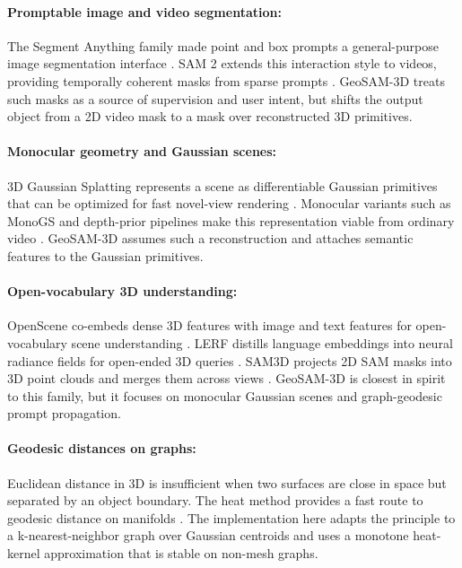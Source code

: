 \documentclass{article}
\begin{document}
\paragraph{Promptable image and video segmentation:}
The Segment Anything family made point and box prompts a general-purpose image segmentation interface \citep{kirillov2023segment}. SAM 2 extends this interaction style to videos, providing temporally coherent masks from sparse prompts \citep{ravi2024sam2}. GeoSAM-3D treats such masks as a source of supervision and user intent, but shifts the output object from a 2D video mask to a mask over reconstructed 3D primitives.

\paragraph{Monocular geometry and Gaussian scenes:}
3D Gaussian Splatting represents a scene as differentiable Gaussian primitives that can be optimized for fast novel-view rendering \citep{kerbl20233d}. Monocular variants such as MonoGS and depth-prior pipelines make this representation viable from ordinary video \citep{matsuki2024monogs,yang2024depth}. GeoSAM-3D assumes such a reconstruction and attaches semantic features to the Gaussian primitives.

\paragraph{Open-vocabulary 3D understanding:}
OpenScene co-embeds dense 3D features with image and text features for open-vocabulary scene understanding \citep{peng2023openscene}. LERF distills language embeddings into neural radiance fields for open-ended 3D queries \citep{kerr2023lerf}. SAM3D projects 2D SAM masks into 3D point clouds and merges them across views \citep{yang2023sam3d}. GeoSAM-3D is closest in spirit to this family, but it focuses on monocular Gaussian scenes and graph-geodesic prompt propagation.

\paragraph{Geodesic distances on graphs:}
Euclidean distance in 3D is insufficient when two surfaces are close in space but separated by an object boundary. The heat method provides a fast route to geodesic distance on manifolds \citep{crane2013heat}. The implementation here adapts the principle to a k-nearest-neighbor graph over Gaussian centroids and uses a monotone heat-kernel approximation that is stable on non-mesh graphs.
\end{document}
